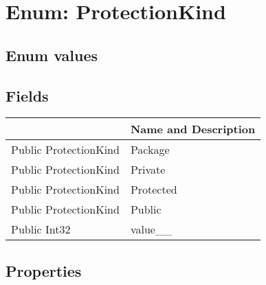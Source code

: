 \documentclass[11pt, oneside, a4paper]{book}
\begin{document}
\section{Enum: ProtectionKind}

\subsection{Enum values}

\subsection{Fields}
\begin{center}
\begin{tabular}{| p{3cm} | p{12cm} | }
\hline
\textbf{ } & \textbf{ Name and Description}\\
\hline
 Public  ProtectionKind &  Package\hypertarget{SoftwareEngineeringTools.{}Documentation.{}ProtectionKind.{}Package}{}\\
\hline
 Public  ProtectionKind &  Private\hypertarget{SoftwareEngineeringTools.{}Documentation.{}ProtectionKind.{}Private}{}\\
\hline
 Public  ProtectionKind &  Protected\hypertarget{SoftwareEngineeringTools.{}Documentation.{}ProtectionKind.{}Protected}{}\\
\hline
 Public  ProtectionKind &  Public\hypertarget{SoftwareEngineeringTools.{}Documentation.{}ProtectionKind.{}Public}{}\\
\hline
 Public  Int32 &  value\_\_\hypertarget{SoftwareEngineeringTools.{}Documentation.{}ProtectionKind.{}value\_\_}{}\\
\hline
\end{tabular}
\end{center}

\subsection{Properties}
\end{document}
